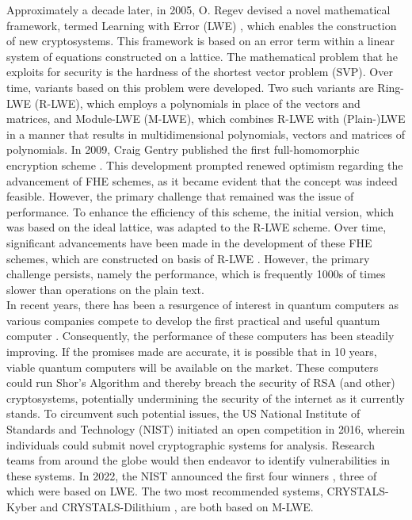 Approximately a decade later, in 2005, O. Regev devised a novel mathematical framework, termed Learning with Error (LWE) \cite{Regev2005OnLL}, which enables the construction of new cryptosystems. This framework is based on an error term within a linear system of equations constructed on a lattice. The mathematical problem that he exploits for security is the hardness of the shortest vector problem (SVP). Over time, variants based on this problem were developed. Two such variants are Ring-LWE (R-LWE), which employs a polynomials in place of the vectors and matrices, and Module-LWE (M-LWE), which combines R-LWE with (Plain-)LWE in a manner that results in multidimensional polynomials, vectors and matrices of polynomials. In 2009, Craig Gentry published the first full-homomorphic encryption scheme \cite{Gentry2009AFH}. This development prompted renewed optimism regarding the advancement of FHE schemes, as it became evident that the concept was indeed feasible. However, the primary challenge that remained was the issue of performance. To enhance the efficiency of this scheme, the initial version, which was based on the ideal lattice, was adapted to the R-LWE scheme. Over time, significant advancements have been made in the development of these FHE schemes, which are constructed on basis of R-LWE \cite{FHESurvey}. However, the primary challenge persists, namely the performance, which is frequently 1000s of times slower than operations on the plain text.\\
In recent years, there has been a resurgence of interest in quantum computers as various companies compete to develop the first practical and useful quantum computer \cite{googleQuantumComputing} \cite{ibmQuantumComputing}. Consequently, the performance of these computers has been steadily improving. If the promises made are accurate, it is possible that in 10 years, viable quantum computers will be available on the market. These computers could run Shor's Algorithm and thereby breach the security of RSA (and other) cryptosystems, potentially undermining the security of the internet as it currently stands. To circumvent such potential issues, the US National Institute of Standards and Technology (NIST) initiated an open competition in 2016, wherein individuals could submit novel cryptographic systems for analysis. Research teams from around the globe would then endeavor to identify vulnerabilities in these systems. In 2022, the NIST announced the first four winners \cite{nistAnouncement}, three of which were based on LWE. The two most recommended systems, CRYSTALS-Kyber \cite{CyrstalsKyber} and CRYSTALS-Dilithium \cite{crystalsDilithium}, are both based on M-LWE.


